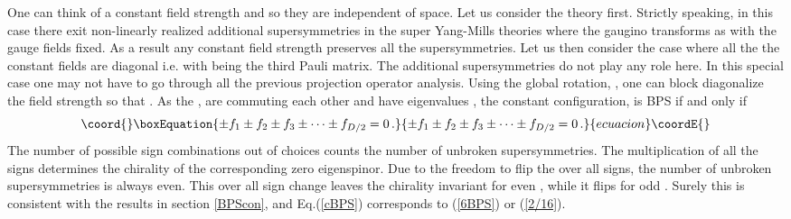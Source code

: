 \documentclass[a4paper,11pt]{article}
\begin{document}
One can think of a constant field strength and so they are independent of space.  Let us consider the   \coordHE{} theory first. Strictly
speaking, in this case there exit non-linearly realized additional supersymmetries in the super Yang-Mills theories where the gaugino transforms as
\myHighlight{$\delta \lambda=\varepsilon^{\prime}$}\coordHE{} with the gauge fields fixed.  As a result  any constant field strength  preserves all the  supersymmetries.
Let us then consider the \coordHE{} case where all the the constant fields are diagonal i.e. \coordHE{} with \coordHE{} being
the third Pauli matrix. The additional supersymmetries do not play any role here. In this special case one may not have to go through all the
previous projection operator analysis. Using the global rotation,  \coordHE{}, one can block diagonalize the field strength so that
\coordHE{}. As the \coordHE{},  \coordHE{} are commuting each other and have eigenvalues
\coordHE{}, the constant configuration, \coordHE{} is  BPS if and only if
\begin{equation}\coord{}\boxEquation{
\pm f_1 \pm f_2 \pm f_3 \pm \cdots\pm f_{D/2}=0\,. \label{cBPS}
}{
\pm f_1 \pm f_2 \pm f_3 \pm \cdots\pm f_{D/2}=0\,. }{ecuacion}\coordE{}\end{equation}
The number of possible  sign combinations out of  \coordHE{} choices counts the number of unbroken supersymmetries. The multiplication of all the
signs determines the chirality of the corresponding zero eigenspinor.  Due to the freedom to flip the over all signs, the number of unbroken
supersymmetries is always even. This over all sign change  leaves the chirality invariant for even \coordHE{}, while it flips for odd \coordHE{}. Surely this
is consistent with the results in section \ref{BPScon}, and  Eq.(\ref{cBPS}) corresponds to (\ref{6BPS}) or (\ref{2/16}).
\end{document}
